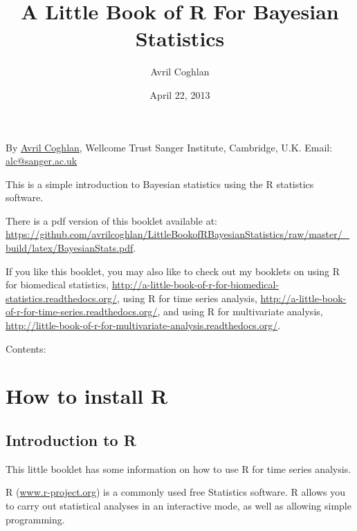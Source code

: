 \documentclass[a4paper,10pt,english]{sphinxmanual}
\title{A Little Book of R For Bayesian Statistics}
\date{April 22, 2013}
\author{Avril Coghlan}
\begin{document}
\maketitle
\tableofcontents
{}\label{index::doc}


By \href{http://www.sanger.ac.uk/research/projects/parasitegenomics/}{Avril Coghlan},
Wellcome Trust Sanger Institute, Cambridge, U.K.
Email: \href{mailto:alc@sanger.ac.uk}{alc@sanger.ac.uk}

This is a simple introduction to Bayesian statistics using the R statistics software.

There is a pdf version of this booklet available at:
\href{https://github.com/avrilcoghlan/LittleBookofRBayesianStatistics/raw/master/\_build/latex/BayesianStats.pdf}{https://github.com/avrilcoghlan/LittleBookofRBayesianStatistics/raw/master/\_build/latex/BayesianStats.pdf}.

If you like this booklet, you may also like to check out my booklets on using
R for biomedical statistics,
\href{http://a-little-book-of-r-for-biomedical-statistics.readthedocs.org/}{http://a-little-book-of-r-for-biomedical-statistics.readthedocs.org/},
using R for time series analysis,
\href{http://a-little-book-of-r-for-time-series.readthedocs.org/}{http://a-little-book-of-r-for-time-series.readthedocs.org/}, and
using R for multivariate analysis,
\href{http://little-book-of-r-for-multivariate-analysis.readthedocs.org/}{http://little-book-of-r-for-multivariate-analysis.readthedocs.org/}.

Contents:


\chapter{How to install R}
\label{src/installr:welcome-to-a-little-book-of-r-for-bayesian-statistics}\label{src/installr:how-to-install-r}\label{src/installr::doc}

\section{Introduction to R}
\label{src/installr:introduction-to-r}
This little booklet has some information on how to use R for time series analysis.

R (\href{http://www.r-project.org/}{www.r-project.org}) is a commonly used
free Statistics software. R allows you to carry out statistical
analyses in an interactive mode, as well as allowing simple programming.
\end{document}
